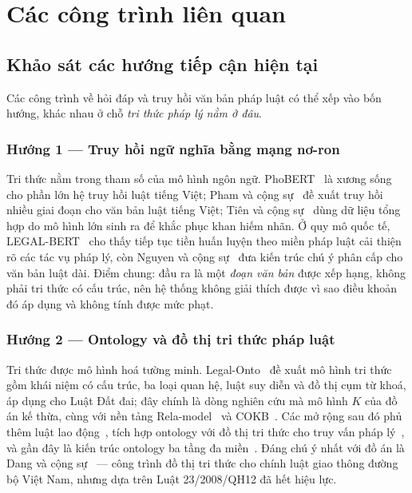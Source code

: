 \section{Các công trình liên quan}
\label{sec:lien-quan}

\subsection{Khảo sát các hướng tiếp cận hiện tại}

Các công trình về hỏi đáp và truy hồi văn bản pháp luật có thể xếp vào bốn hướng, khác
nhau ở chỗ \emph{tri thức pháp lý nằm ở đâu}.

\subsubsection{Hướng 1 --- Truy hồi ngữ nghĩa bằng mạng nơ-ron}

Tri thức nằm trong tham số của mô hình ngôn ngữ. PhoBERT~\cite{phobert} là xương sống cho
phần lớn hệ truy hồi luật tiếng Việt; Pham và cộng sự~\cite{phamMultistage} đề xuất truy
hồi nhiều giai đoạn cho văn bản luật tiếng Việt; Tiên và cộng sự~\cite{tienSynthetic} dùng
dữ liệu tổng hợp do mô hình lớn sinh ra để khắc phục khan hiếm nhãn. Ở quy mô quốc tế,
LEGAL-BERT~\cite{legalbert} cho thấy tiếp tục tiền huấn luyện theo miền pháp luật cải thiện
rõ các tác vụ pháp lý, còn Nguyen và cộng sự~\cite{nguyenAttentive} đưa kiến trúc chú ý
phân cấp cho văn bản luật dài. Điểm chung: đầu ra là một \emph{đoạn văn bản} được xếp hạng,
không phải tri thức có cấu trúc, nên hệ thống không giải thích được vì sao điều khoản đó áp
dụng và không tính được mức phạt.

\subsubsection{Hướng 2 --- Ontology và đồ thị tri thức pháp luật}

Tri thức được mô hình hoá tường minh. Legal-Onto~\cite{legalonto} đề xuất mô hình tri thức
gồm khái niệm có cấu trúc, ba loại quan hệ, luật suy diễn và đồ thị cụm từ khoá, áp dụng
cho Luật Đất đai; đây chính là dòng nghiên cứu mà mô hình $K$ của đồ án kế thừa, cùng với
nền tảng Rela-model~\cite{relamodel} và COKB~\cite{cokb}. Các mở rộng sau đó phủ thêm luật
lao động~\cite{phamLabor,phamLegalOntoUpdate}, tích hợp ontology với đồ thị tri thức cho
truy vấn pháp lý~\cite{phamOntoKG}, và gần đây là kiến trúc ontology ba tầng đa
miền~\cite{phamUnified}. Đáng chú ý nhất với đồ án là Dang và cộng sự~\cite{dangKG} ---
công trình đồ thị tri thức cho chính luật giao thông đường bộ Việt Nam, nhưng dựa trên Luật
23/2008/QH12 đã hết hiệu lực.

